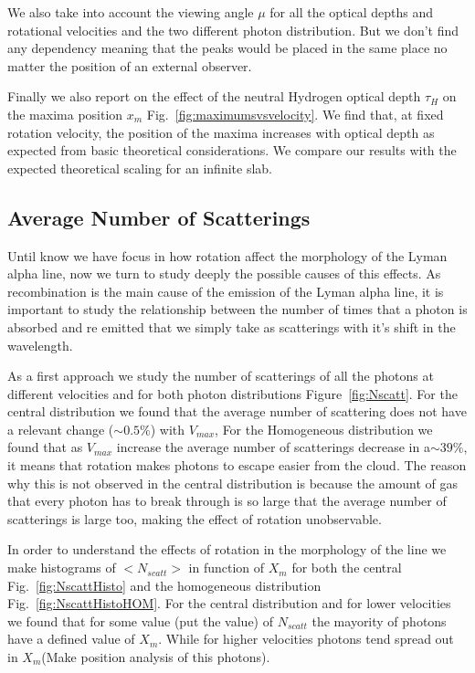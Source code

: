 \documentclass[usenatbib]{mn2e}
\begin{document}
We also take into account the viewing angle $\mu$ for all the optical 
depths and rotational velocities and the two different photon distribution.
But we don't find any dependency meaning that the peaks would be placed in
the same place no matter the position of an external observer.	

Finally we also report on the effect of the neutral Hydrogen
optical depth $\tau_{H}$ on the maxima position $x_{m}$
Fig.~\ref{fig:maximumsvsvelocity}. We find that, at fixed
rotation velocity, the position of the maxima increases with optical
depth as expected from basic theoretical considerations. We compare
our results with the expected theoretical scaling for an infinite
slab. 



\subsection{Average Number of Scatterings}

Until know we have focus in how rotation affect the morphology of the 
Lyman alpha line, now we turn to study deeply the possible causes of 
this effects. As recombination is the main cause of the emission of the 
Lyman alpha line, it is important to study the relationship between the 
number of times that a photon is absorbed and re emitted that we simply 
take as scatterings with it's shift in the wavelength. 

As a first approach we study the number of scatterings of all the photons 
at different velocities and for both photon distributions Figure~\ref{fig:Nscatt}. 
For the central distribution we found that the average number of scattering 
does not have a relevant change ($\sim 0.5\%$) with $V_{max}$, For the 
Homogeneous distribution we found that as $V_{max}$ increase the average 
number of scatterings decrease in a$\sim 39\%$, it means that rotation 
makes photons to escape easier from the cloud. The reason why this is not 
observed in the central distribution is because the amount of gas that every 
photon has to break through is so large that the average number of scatterings 
is large too, making the effect of rotation unobservable.

In order to understand the effects of rotation in the morphology of the line
 we make histograms of $<N_{scatt}>$  in function of $X_{m}$ for both the 
 central Fig.~\ref{fig:NscattHisto} and the  homogeneous distribution 
 Fig.~\ref{fig:NscattHistoHOM}. For the central distribution and for lower 
 velocities we found that for some value (put the value) of $N_{scatt}$ the 
 mayority of photons have a defined value of $X_{m}$. While for higher 
 velocities photons tend spread out in $X_{m}$(Make position analysis of 
 this photons).
\end{document}
